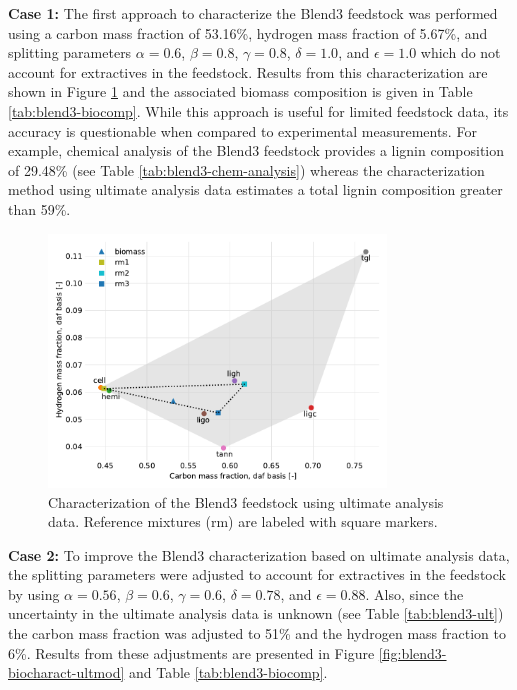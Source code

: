 \textbf{Case 1:} The first approach to characterize the Blend3 feedstock was performed using a carbon mass fraction of 53.16\%, hydrogen mass fraction of 5.67\%, and splitting parameters $\alpha = 0.6$, $\beta = 0.8$, $\gamma = 0.8$, $\delta = 1.0$, and $\epsilon = 1.0$ which do not account for extractives in the feedstock. Results from this characterization are shown in Figure \ref{fig:blend3-biocharact-ult} and the associated biomass composition is given in Table \ref{tab:blend3-biocomp}. While this approach is useful for limited feedstock data, its accuracy is questionable when compared to experimental measurements. For example, chemical analysis of the Blend3 feedstock provides a lignin composition of 29.48\% (see Table \ref{tab:blend3-chem-analysis}) whereas the characterization method using ultimate analysis data estimates a total lignin composition greater than 59\%.

\begin{figure}[H]
    \centering
    \includegraphics[width=0.8\textwidth]{figures/blend3-biocharact-ult.pdf}
    \caption{Characterization of the Blend3 feedstock using ultimate analysis data. Reference mixtures (rm) are labeled with square markers.}
    \label{fig:blend3-biocharact-ult}
\end{figure}

\textbf{Case 2:} To improve the Blend3 characterization based on ultimate analysis data, the splitting parameters were adjusted to account for extractives in the feedstock by using $\alpha = 0.56$, $\beta = 0.6$, $\gamma = 0.6$, $\delta = 0.78$, and $\epsilon = 0.88$. Also, since the uncertainty in the ultimate analysis data is unknown (see Table \ref{tab:blend3-ult}) the carbon mass fraction was adjusted to 51\% and the hydrogen mass fraction to 6\%. Results from these adjustments are presented in Figure \ref{fig:blend3-biocharact-ultmod} and Table \ref{tab:blend3-biocomp}.

